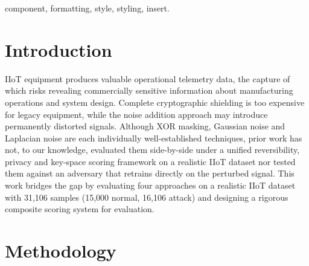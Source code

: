 \documentclass[conference]{IEEEtran}
\begin{document}
\begin{abstract}
IIoT(Industrial Internet of Things) systems constantly stream telemetry data from sensors and machinery to the cloud, posing serious privacy and security challenges. Conventional encryption methods are computationally too expensive for legacy devices involving complex mathematical operations like fiestel structures, discrete logarithm, etc., while common noise-based perturbation methods irreversibly distort data. We introduce and evaluate a lightweight, fully reversible data perturbation pipeline for IIoT telemetry, contributing a composite reversibility privacy-key-space scoring framework for comparing perturbation strategies under realistic legacy-device constraints. To assess the balance between privacy and utility, a dataset comprising 31,106 IIoT intrusion detection samples covering five distinct attack categories was employed. After training a classifier that achieved a 98.47%
\end{abstract}

\begin{IEEEkeywords}
component, formatting, style, styling, insert.
\end{IEEEkeywords}

\section{Introduction}
IIoT equipment produces valuable operational telemetry data, the capture of which risks revealing commercially sensitive information about manufacturing operations and system design. Complete cryptographic shielding is too expensive for legacy equipment, while the noise addition approach may introduce permanently distorted signals. Although XOR masking, Gaussian noise and Laplacian noise are each individually well-established techniques, prior work has not, to our knowledge, evaluated them side-by-side under a unified reversibility, privacy and key-space scoring framework on a realistic IIoT dataset nor tested them against an adversary that retrains directly on the perturbed signal. This work bridges the gap by evaluating four approaches on a realistic IIoT dataset with 31,106 samples (15,000 normal, 16,106 attack) and designing a rigorous composite scoring system for evaluation. 

\section{Methodology}
\end{document}
